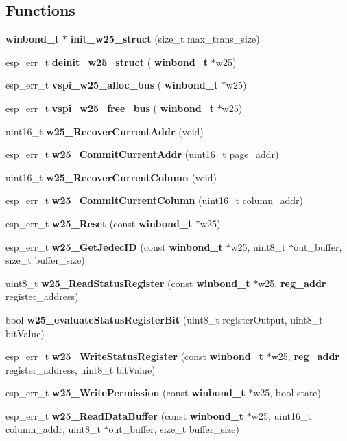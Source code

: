 \subsection*{Functions}
\begin{DoxyCompactItemize}
\item 
\textbf{ winbond\+\_\+t} $\ast$ \textbf{ init\+\_\+w25\+\_\+struct} (size\+\_\+t max\+\_\+trans\+\_\+size)
\item 
esp\+\_\+err\+\_\+t \textbf{ deinit\+\_\+w25\+\_\+struct} (\textbf{ winbond\+\_\+t} $\ast$w25)
\item 
esp\+\_\+err\+\_\+t \textbf{ vspi\+\_\+w25\+\_\+alloc\+\_\+bus} (\textbf{ winbond\+\_\+t} $\ast$w25)
\item 
esp\+\_\+err\+\_\+t \textbf{ vspi\+\_\+w25\+\_\+free\+\_\+bus} (\textbf{ winbond\+\_\+t} $\ast$w25)
\item 
uint16\+\_\+t \textbf{ w25\+\_\+\+Recover\+Current\+Addr} (void)
\item 
esp\+\_\+err\+\_\+t \textbf{ w25\+\_\+\+Commit\+Current\+Addr} (uint16\+\_\+t page\+\_\+addr)
\item 
uint16\+\_\+t \textbf{ w25\+\_\+\+Recover\+Current\+Column} (void)
\item 
esp\+\_\+err\+\_\+t \textbf{ w25\+\_\+\+Commit\+Current\+Column} (uint16\+\_\+t column\+\_\+addr)
\item 
esp\+\_\+err\+\_\+t \textbf{ w25\+\_\+\+Reset} (const \textbf{ winbond\+\_\+t} $\ast$w25)
\item 
esp\+\_\+err\+\_\+t \textbf{ w25\+\_\+\+Get\+Jedec\+ID} (const \textbf{ winbond\+\_\+t} $\ast$w25, uint8\+\_\+t $\ast$out\+\_\+buffer, size\+\_\+t buffer\+\_\+size)
\item 
uint8\+\_\+t \textbf{ w25\+\_\+\+Read\+Status\+Register} (const \textbf{ winbond\+\_\+t} $\ast$w25, \textbf{ reg\+\_\+addr} register\+\_\+address)
\item 
bool \textbf{ w25\+\_\+evaluate\+Status\+Register\+Bit} (uint8\+\_\+t register\+Output, uint8\+\_\+t bit\+Value)
\item 
esp\+\_\+err\+\_\+t \textbf{ w25\+\_\+\+Write\+Status\+Register} (const \textbf{ winbond\+\_\+t} $\ast$w25, \textbf{ reg\+\_\+addr} register\+\_\+address, uint8\+\_\+t bit\+Value)
\item 
esp\+\_\+err\+\_\+t \textbf{ w25\+\_\+\+Write\+Permission} (const \textbf{ winbond\+\_\+t} $\ast$w25, bool state)
\item 
esp\+\_\+err\+\_\+t \textbf{ w25\+\_\+\+Read\+Data\+Buffer} (const \textbf{ winbond\+\_\+t} $\ast$w25, uint16\+\_\+t column\+\_\+addr, uint8\+\_\+t $\ast$out\+\_\+buffer, size\+\_\+t buffer\+\_\+size)

\end{DoxyCompactItemize}
